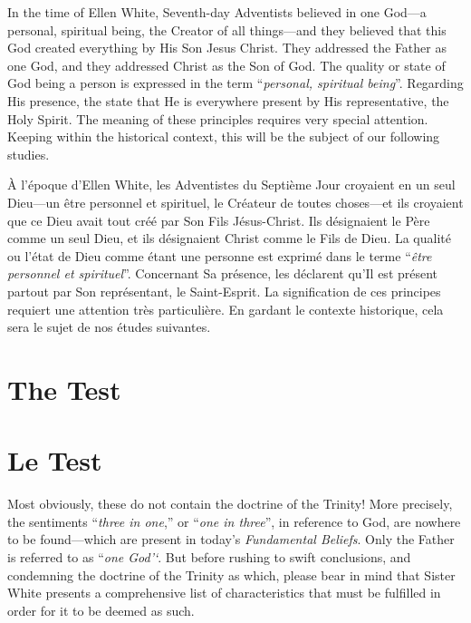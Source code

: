 In the time of Ellen White, Seventh-day Adventists believed in one God—a personal, spiritual being, the Creator of all things—and they believed that this God created everything by His Son Jesus Christ. They addressed the Father as one God, and they addressed Christ as the Son of God. The quality or state of God being a person is expressed in the term “\textit{personal, spiritual being}”. Regarding His presence, the  state that He is everywhere present by His representative, the Holy Spirit. The meaning of these principles requires very special attention. Keeping within the historical context, this will be the subject of our following studies.


À l'époque d'Ellen White, les Adventistes du Septième Jour croyaient en un seul Dieu—un être personnel et spirituel, le Créateur de toutes choses—et ils croyaient que ce Dieu avait tout créé par Son Fils Jésus-Christ. Ils désignaient le Père comme un seul Dieu, et ils désignaient Christ comme le Fils de Dieu. La qualité ou l'état de Dieu comme étant une personne est exprimé dans le terme “\textit{être personnel et spirituel}”. Concernant Sa présence, les  déclarent qu'Il est présent partout par Son représentant, le Saint-Esprit. La signification de ces principes requiert une attention très particulière. En gardant le contexte historique, cela sera le sujet de nos études suivantes.


\section*{The Test}


\section*{Le Test}


Most obviously, these  do not contain the doctrine of the Trinity! More precisely, the sentiments “\textit{three in one},” or “\textit{one in three}”, in reference to God, are nowhere to be found—which are present in today’s \textit{Fundamental Beliefs}. Only the Father is referred to as “\textit{one God’‘}. But before rushing to swift conclusions, and condemning the doctrine of the Trinity as which, please bear in mind that Sister White presents a comprehensive list of characteristics that must be fulfilled in order for it to be deemed as such.


